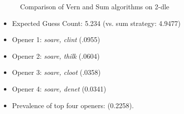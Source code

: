 \documentclass[11pt, oneside]{article} 	%
\begin{document}
\begin{figure}[!htb]
 \centering
 \qquad
 \caption{Comparison of Vern and Sum algorithms on 2-dle}%
\end{figure}


\begin{itemize}
\item Expected Guess Count: 5.234 (vs. sum strategy: 4.9477)
\item Opener 1: \emph{soare, clint} (.0955)
\item Opener 2: \emph{soare, thilk} (.0604)
\item Opener 3: \emph{soare, cloot} (.0358)
\item Opener 4: \emph{soare, denet} (0.0341)
\item Prevalence of top four openers: (0.2258). 
\end{itemize}
\end{document}
